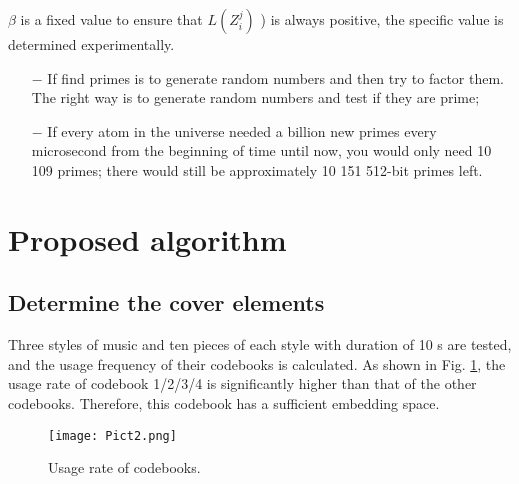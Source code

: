 \documentclass[12pt]{article}
\begin{document}
    $\beta$ is a fixed value to ensure that $L(Z^j_i)$ ) is always positive, the specific value is determined experimentally.
\begin{itemize}
\item[$-$] If  find primes is to generate random numbers and then try to factor them. The right
way is to generate random numbers and test if they are prime;
\item[$-$]If every atom in the universe needed a billion new primes every microsecond from the beginning of time until now, you would only need 10 109 primes; there would still be approximately 10 151 512-bit primes left.
\end{itemize}
\section{Proposed algorithm}
\subsection{Determine the cover elements}
Three styles of music and ten pieces of each style with duration of 10 s are tested, and the usage frequency of their codebooks is calculated. As shown in Fig. \ref{Pic2}, the usage rate of codebook 1/2/3/4 is significantly higher than that of the other codebooks. Therefore, this codebook has a sufficient embedding space.
\begin{figure}[H]
    \label{Pic2}
    \centering
    \texttt{[image: Pict2.png]}
    \caption{Usage rate of codebooks.}
\end{figure}
\end{document}
